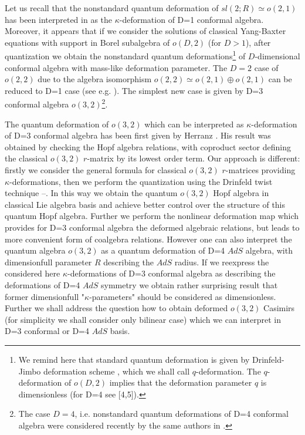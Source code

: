 \documentclass[a4paper,12pt,showkeys]{article}
\begin{document}
Let us recall  that the nonstandard quantum deformation of
 $sl(2;R)\simeq o(2,1)$ has been
  interpreted in
\cite{ll1}
   as the $ \kappa$-deformation
 of D=1 conformal algebra. Moreover, it appears that if we consider the
 solutions of classical Yang-Baxter equations with support in Borel
 subalgebra  of
  $o(D,2)$ (for $D > 1$), after quantization we obtain the nonstandard
  quantum deformations\footnote{We remind here that standard quantum
  deformation is given by Drinfeld-Jimbo deformation scheme
  \cite{ll2,ll3},
  which
   we shall call $q$-deformation. The $q$-deformation of $o(D,2)$
   implies that the deformation parameter $q$ is dimensionless
   (for D=4 see
   [4,5]).}
   of $D$-dimensional conformal algebra with mass-like
    deformation parameter.
   The $D=2$ case of $o(2,2)$ due to the algebra isomorphism
$o(2,2) \simeq o(2,1)  \oplus o(2,1)$ can be reduced to D=1 case
(see e.g.
 \cite{ll6}). The simplest new case is given by D=3 conformal
algebra
 $o(3,2)$\footnote{The case $D=4$, i.e. nonstandard quantum
 deformations of D=4 conformal
algebra were considered recently by the same authors in
 \cite{ll7}.}.

 The quantum deformation of $o(3,2)$ which can be interpreted as
 \sloppy $\kappa$-de\-for\-ma\-tion of D=3 conformal algebra has been
 first given
  by Herranz
   \cite{ll8}. His result was obtained by checking the Hopf
   algebra relations, with coproduct sector defining
    the classical $o(3,2)$ $r$-matrix by its  lowest order term.
    Our approach is  different: firstly we consider the general
     formula for classical $o(3,2)$   $r$-matrices
    providing $\kappa$-deformations, then we perform
    the quantization using the Drinfeld twist technique
     \cite{ll9}--\cite{ll11}.
     In this  way we obtain the quantum $o(3,2)$  Hopf algebra in
    classical Lie algebra basis and achieve
    better control over the structure of this
    quantum Hopf algebra.
    Further we perform the nonlinear deformation map which provides
     for D=3 conformal algebra
    the deformed algebraic relations,
     but leads to more convenient form of
     coalgebra relations. However one can also interpret the
     quantum algebra $o(3,2)$ as a quantum deformation of D=4 $AdS$
   algebra, with dimensionfull parameter $R$ describing the
   $AdS$ radius. If we reexpress  the
    considered  here $\kappa$-deformations of D=3 conformal
    algebra as describing the deformations of D=4 $AdS$
      symmetry we
    obtain rather surprising
     result that former dimensionfull "$\kappa$-parameters" should
     be considered  as dimensionless.
     Further we shall
     address
    the question
  how to  obtain deformed $o(3,2)$ Casimirs (for
    simplicity we shall consider only bilinear case) which
     we can interpret in D=3
    conformal or D=4 $AdS$ basis.
\end{document}
